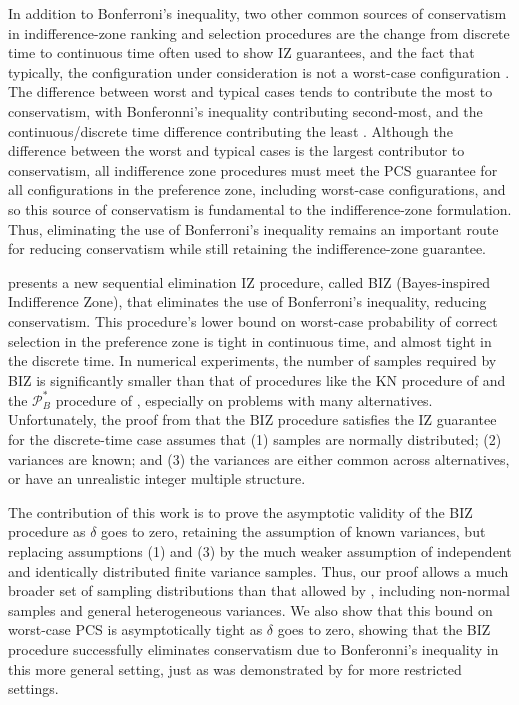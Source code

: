 \documentclass{wscpaperproc}
\theoremstyle{wsc}
\begin{document}
In addition to Bonferroni's inequality, two other common sources of conservatism in indifference-zone ranking and selection procedures are the change from discrete time to continuous time often used to show IZ guarantees, and the fact that typically, the configuration under consideration is not a worst-case configuration \cite{Kim:Conserv}.  The difference between worst and typical cases tends to contribute the most to conservatism, with Bonferonni's inequality contributing second-most, and the continuous/discrete time difference contributing the least \cite{Kim:Conserv}.
Although the difference between the worst and typical cases is the largest contributor to conservatism, all indifference zone procedures must meet the PCS guarantee for all configurations in the preference zone, including worst-case configurations, and so this source of conservatism is fundamental to the indifference-zone formulation.  Thus, eliminating the use of Bonferroni's inequality remains an important route for reducing conservatism while still retaining the indifference-zone guarantee.


 presents a new sequential elimination
IZ procedure, called BIZ (Bayes-inspired Indifference Zone), 
that eliminates the use of Bonferroni's inequality, reducing conservatism. 
This procedure's lower bound on worst-case probability of correct selection in the
preference zone is tight in continuous time, and almost tight in the
discrete time. In numerical experiments, the number of samples required
by BIZ is significantly smaller than that of procedures like the KN procedure of  and
the $\mathcal{P}_{B}^{*}$ procedure of , 
especially on problems with many alternatives. Unfortunately, the
proof from \cite{Frazier:BIZ} that the BIZ procedure satisfies the IZ guarantee for the discrete-time case assumes that (1) samples are normally distributed; 
(2) variances are known;
and (3) the variances are either common across alternatives, or have an unrealistic integer multiple structure.

The contribution of this work is to prove the asymptotic validity of the BIZ procedure as $\delta$ goes to zero, retaining the assumption of known variances, but replacing assumptions (1) and (3) by the much weaker assumption of independent and identically distributed finite variance samples.  Thus, our proof allows a much broader set of sampling distributions than that allowed by \cite{Frazier:BIZ}, including non-normal samples and general heterogeneous variances. 
We also show that this bound on worst-case PCS is asymptotically tight as $\delta$ goes to zero, 
showing that the BIZ procedure successfully eliminates conservatism due to Bonferonni's inequality in this more general setting, just as was demonstrated by  for more restricted settings.
\end{document}
